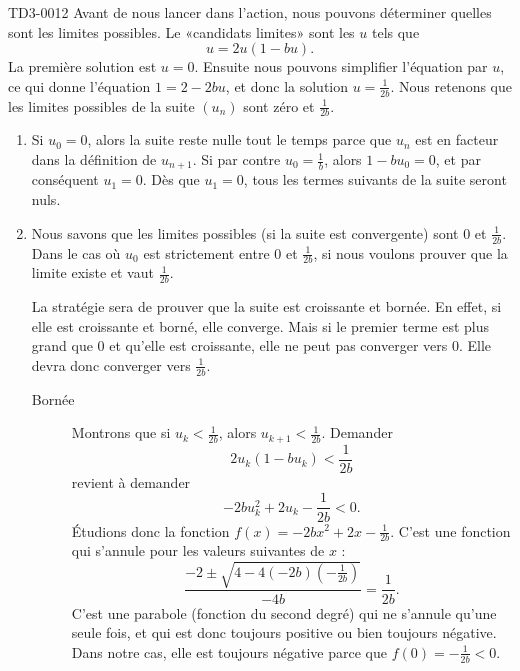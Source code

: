 
\begin{corrige}{TD3-0012}
    Avant de nous lancer dans l'action, nous pouvons déterminer quelles sont les limites possibles. Le «candidats limites» sont les $u$ tels que
    \begin{equation}
        u=2u(1-bu).
    \end{equation}
    La première solution est $u=0$. Ensuite nous pouvons simplifier l'équation par $u$, ce qui donne l'équation $1=2-2bu$, et donc la solution $u=\frac{1}{ 2b }$. Nous retenons que les limites possibles de la suite $(u_n)$ sont zéro et $\frac{1}{ 2b }$.
    \begin{enumerate}
        \item
            Si $u_0=0$, alors la suite reste nulle tout le temps parce que $u_n$ est en facteur dans la définition de $u_{n+1}$. Si par contre $u_0=\frac{1}{ b }$, alors $1-bu_0=0$, et par conséquent $u_1=0$. Dès que $u_1=0$, tous les termes suivants de la suite seront nuls.
        \item
            Nous savons que les limites possibles (si la suite est convergente) sont $0$ et $\frac{1}{ 2b }$. Dans le cas où $u_0$ est strictement entre $0$ et $\frac{1}{ 2b }$, si nous voulons prouver que la limite existe et vaut $\frac{1}{ 2b }$.
            
            La stratégie sera de prouver que la suite est croissante et bornée. En effet, si elle est croissante et borné, elle converge. Mais si le premier terme est plus grand que $0$ et qu'elle est croissante, elle ne peut pas converger vers $0$. Elle devra donc converger vers $\frac{1}{ 2b }$.
        
            \begin{description}
                \item[Bornée] 
                    Montrons que si $u_k<\frac{1}{ 2b }$, alors $u_{k+1}<\frac{1}{ 2b }$. Demander
                    \begin{equation}
                        2u_k(1-bu_k)<\frac{1}{ 2b }
                    \end{equation}
                    revient à demander
                    \begin{equation}
                        -2bu_k^2+2u_k-\frac{1}{ 2b }<0.
                    \end{equation}
                    Étudions donc la fonction $f(x)=-2bx^2+2x-\frac{1}{2b }$. C'est une fonction qui s'annule pour les valeurs suivantes de $x$ :
                    \begin{equation}
                        \frac{ -2\pm\sqrt{4-4(-2b) \left( -\frac{1}{ 2b } \right)  } }{ -4b }=\frac{1}{ 2b }.
                    \end{equation}
                    C'est une parabole (fonction du second degré) qui ne s'annule qu'une seule fois, et qui est donc toujours positive ou bien toujours négative. Dans notre cas, elle est toujours négative parce que $f(0)=-\frac{1}{ 2b }<0$.
                    

\end{description}
\end{enumerate}
\end{corrige}
